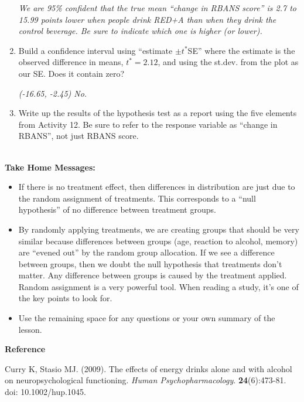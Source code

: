\begin{enumerate}
\begin{key}
  {\it  We are 95\% confident that the true mean ``change in RBANS score''
  is  2.7 to 15.99 points lower when people drink RED+A than when they
   drink the control beverage. Be sure to indicate which one is higher
 (or lower). } 
\end{key}
\item Build a confidence interval using ``estimate $\pm t^*$SE'' where the
  estimate is the observed difference in means, $t^* = 2.12$, and
  using the st.dev. from the plot as our SE.  Does it contain zero?
 \begin{students}
    \vspace{2cm}    
\end{students}

\begin{key}
  {\it (-16.65, -2.45)  No.}
\end{key}


\item Write up the results of the hypothesis test as a report using
  the five elements from Activity 12.  Be sure to refer to the response
  variable as ``change in RBANS'', not just RBANS score. \\ \ \\

\begin{students}
 \newpage 
\end{students}
 \end{enumerate}


{\sf\bf Take Home Messages:}
\begin{itemize}
  \item 
  If there is no treatment effect, then differences in distribution
  are just due to the random assignment of treatments.  This
  corresponds to a ``null hypothesis'' of no difference between
  treatment groups.
\item  By randomly applying treatments, we are creating groups that
  should be very similar because differences between groups (age,
  reaction to alcohol, memory) are “evened out” by the random group
  allocation. If we see a difference between groups, then we doubt the
  null hypothesis that treatments don't matter.  Any difference
  between groups is caused by the treatment applied.  Random
  assignment is a very powerful tool.  When reading a study, it's one
  of the key points to look for. 
 \item 
  Use the remaining space for any questions or your own summary of the
  lesson. \vfill

\end{itemize}
{\sf\bf Reference}

 Curry K, Stasio MJ.  (2009). The effects of energy drinks alone and with
 alcohol on neuropsychological functioning. {\it Human  Psychopharmacology}.
{\bf 24}(6):473-81. doi: 10.1002/hup.1045. 


